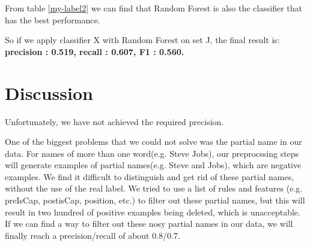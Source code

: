 \documentclass{article}
\begin{document}
From table \ref{my-label2} we can find that Random Forest is also the classifier that has the best performance.

So if we apply classifier X with Random Forest on set J, the final result is:
\textbf{precision : 0.519, recall : 0.607, F1 : 0.560.   }

\section{Discussion}

Unfortunately, we have not achieved the required precision. 

One of the biggest problems that we could not solve was the partial name in our data. For names of more than one word(e.g. Steve Jobs), our preprocssing steps will generate examples of partial names(e.g. Steve and Jobs), which are negative examples. We find it difficult to distinguish and get rid of these partial names, without the use of the real label. We tried to use a list of rules and features (e.g. preIsCap, postisCap, position, etc.) to filter out these partial names, but this will result in two hundred of positive examples being deleted, which is unacceptable. If we can find a way to filter out these nosy partial names in our data, we will finally reach a precision/recall of about 0.8/0.7.

%
%
%
%
%
%
%
%
%
%
\end{document}

